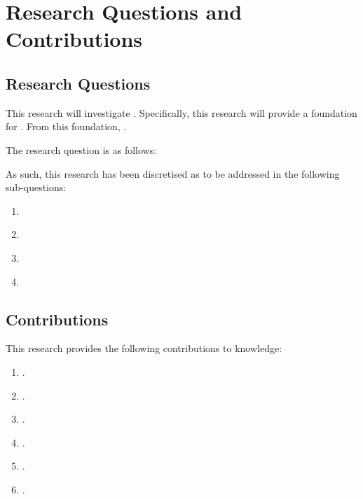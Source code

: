 \lipsum[1-4]
\lipsum[6]

\section{Research Questions and Contributions} \label{sec:prop}

\subsection{Research Questions}\label{sec:ques}

This research will investigate \lipsum[][1]. Specifically, this research will provide a foundation for \lipsum[][2]. From this foundation, \lipsum[][3].


The research question is as follows:

\begin{quote}
    \textit{\lipsum[][4]}
\end{quote}

\lipsum[][5-6]
As such, this research has been discretised as to be addressed in the following sub-questions:

\begin{enumerate}[start=1,label={RQ\arabic*:},wide = 0pt, leftmargin = 3em]
    \item \textit{\lipsum[][1]}
    \item \textit{\lipsum[][2]}
    \item \textit{\lipsum[][3]}
    \item \textit{\lipsum[][4]}
\end{enumerate}

\lipsum[5-6]

\subsection{Contributions} \label{sec:cont}

This research provides the following contributions to knowledge: 
\begin{enumerate}[start=1,label={C\arabic*:},wide = 0pt, leftmargin = 3em]
	\item \lipsum[][1]. 
	\item \lipsum[][2]. 
	\item \lipsum[][3]. 
	\item \lipsum[][4]. 
	\item \lipsum[][5]. 
	\item \lipsum[][6]. 
\end{enumerate}




